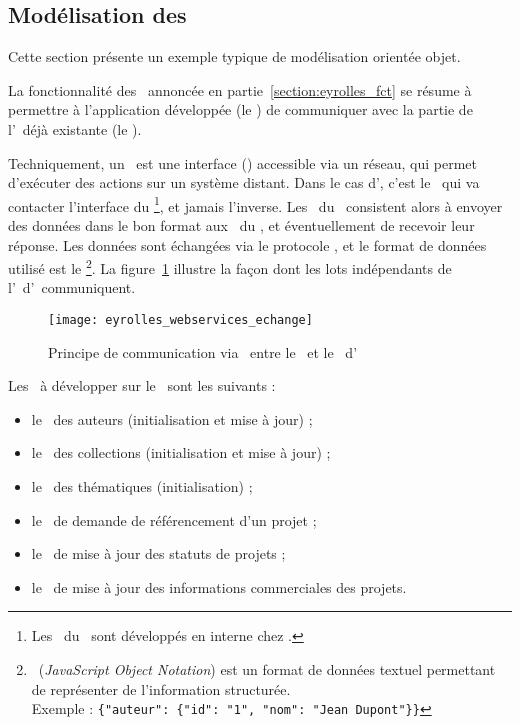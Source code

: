 \subsection{Modélisation des \awss}
\label{section:eyrolles_webservices}

Cette section présente un exemple typique de modélisation orientée objet.

La fonctionnalité des \awss\ annoncée en partie~\ref{section:eyrolles_fct} se résume à permettre à l'application développée (le \alotdeux) de communiquer avec la partie de l'\aintranet\ déjà existante (le \alotun). 

Techniquement, un \aws\ est une interface (\aapi) accessible via un réseau, qui permet d'exécuter des actions sur un système distant. Dans le cas d'\aey, c'est le \alotdeux\ qui va contacter l'interface du \alotun\footnote{Les \awss\ du \alotun\ sont développés en interne chez \aey.}, et jamais l'inverse. Les \awss\ du \alotdeux\ consistent alors à envoyer des données dans le bon format aux \awss\ du \alotun, et éventuellement de recevoir leur réponse. Les données sont échangées via le protocole \ahttp, et le format de données utilisé est le \ajson\footnote{\ajson\ (\textit{JavaScript Object Notation}) est un format de données textuel permettant de représenter de l'information structurée.~\cite{json}\\Exemple : \texttt{\{"auteur": \{"id": "1", "nom": "Jean Dupont"\}\}}}. La figure~\ref{figure:eyrolles_webservices_echange} illustre la façon dont les lots indépendants de l'\aintranet\ d'\aey\ communiquent.

\begin{figure}
	\centering
	\texttt{[image: eyrolles\_webservices\_echange]}
	\caption{Principe de communication via \aws\ entre le \alotun\ et le \alotdeux\ d'\aey}
	\label{figure:eyrolles_webservices_echange}
\end{figure}

Les \awss\ à développer sur le \alotdeux\ sont les suivants :

\begin{itemize}
	\item le \aws\ des auteurs (initialisation et mise à jour) ;
	\item le \aws\ des collections (initialisation et mise à jour) ;
	\item le \aws\ des thématiques (initialisation) ;
	\item le \aws\ de demande de référencement d'un projet ;
	\item le \aws\ de mise à jour des statuts de projets ;
	\item le \aws\ de mise à jour des informations commerciales des projets.
\end{itemize}

